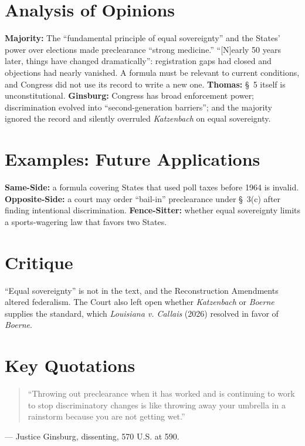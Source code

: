 \documentclass[12pt]{article}
\begin{document}
\section{Analysis of Opinions}
\textbf{Majority:} The ``fundamental principle of equal sovereignty'' and the States' power over elections made preclearance ``strong medicine.'' ``[N]early 50 years later, things have changed dramatically'': registration gaps had closed and objections had nearly vanished. A formula must be relevant to current conditions, and Congress did not use its record to write a new one. \textbf{Thomas:} \S~5 itself is unconstitutional. \textbf{Ginsburg:} Congress has broad enforcement power; discrimination evolved into ``second-generation barriers''; and the majority ignored the record and silently overruled \textit{Katzenbach} on equal sovereignty.

\section{Examples: Future Applications}
\textbf{Same-Side:} a formula covering States that used poll taxes before 1964 is invalid. \textbf{Opposite-Side:} a court may order ``bail-in'' preclearance under \S~3(c) after finding intentional discrimination. \textbf{Fence-Sitter:} whether equal sovereignty limits a sports-wagering law that favors two States.

\section{Critique}
``Equal sovereignty'' is not in the text, and the Reconstruction Amendments altered federalism. The Court also left open whether \textit{Katzenbach} or \textit{Boerne} supplies the standard, which \textit{Louisiana v. Callais} (2026) resolved in favor of \textit{Boerne}.

\section{Key Quotations}
\begin{quote}
``Throwing out preclearance when it has worked and is continuing to work to stop discriminatory changes is like throwing away your umbrella in a rainstorm because you are not getting wet.''
\end{quote}
\noindent --- Justice Ginsburg, dissenting, 570 U.S. at 590.
\end{document}
